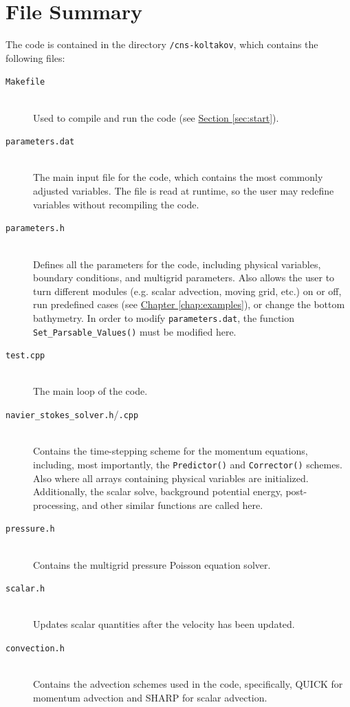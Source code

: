 \documentclass[12pt]{report}
\begin{document}
\section{File Summary}
The code is contained in the directory \texttt{/cns-koltakov}, which contains the following files:
\begin{description}
\item[\texttt{Makefile}] \hfill \\Used to compile and run the code (see \hyperref[sec:start]{Section \ref*{sec:start}}).
\item[\texttt{parameters.dat}] \hfill \\The main input file for the code, which contains the most commonly adjusted variables. The file is read at runtime, so the user may redefine variables without recompiling the code.
\item[\texttt{parameters.h}] \hfill \\Defines all the parameters for the code, including physical variables, boundary conditions, and multigrid parameters. Also allows the user to turn different modules (e.g. scalar advection, moving grid, etc.) on or off, run predefined cases (see \hyperref[chap:examples]{Chapter \ref*{chap:examples}}), or change the bottom bathymetry. In order to modify \texttt{parameters.dat}, the function \texttt{Set\_Parsable\_Values()} must be modified here.
\item[\texttt{test.cpp}] \hfill \\The main loop of the code. 
\item[\texttt{navier\_stokes\_solver.h}/\texttt{.cpp}] \hfill \\Contains the time-stepping scheme for the momentum equations, including, most importantly, the \texttt{Predictor()} and \texttt{Corrector()} schemes. Also where all arrays containing physical variables are initialized. Additionally, the scalar solve, background potential energy, post-processing, and other similar functions are called here.
\item[\texttt{pressure.h}] \hfill \\Contains the multigrid pressure Poisson equation solver.
\item[\texttt{scalar.h}] \hfill \\Updates scalar quantities after the velocity has been updated.
\item[\texttt{convection.h}] \hfill \\Contains the advection schemes used in the code, specifically, QUICK for momentum advection and SHARP for scalar advection.

\end{description}
\end{document}
